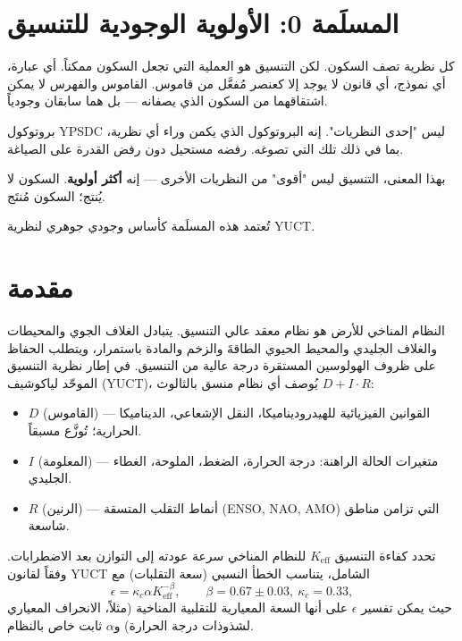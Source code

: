 \documentclass[11pt,a4paper]{article}
\newcommand{\Keff}{K_{\mathrm{eff}}}
\newcommand{\kappac}{\kappa_c}
\newcommand{\be}{\beta}
\begin{document}
	\tableofcontents
	
	\section*{المسلَمة 0: الأولوية الوجودية للتنسيق}
	
	كل نظرية تصف السكون. لكن التنسيق هو العملية التي تجعل السكون ممكناً.
	أي عبارة، أي نموذج، أي قانون لا يوجد إلا كعنصر مُفعَّل من قاموس.
	القاموس والفهرس لا يمكن اشتقاقهما من السكون الذي يصفانه — بل هما سابقان وجودياً.
	
	بروتوكول YPSDC ليس "إحدى النظريات".
	إنه البروتوكول الذي يكمن وراء أي نظرية، بما في ذلك تلك التي تصوغه.
	رفضه مستحيل دون رفض القدرة على الصياغة.
	
	بهذا المعنى، التنسيق ليس "أقوى" من النظريات الأخرى — إنه \textbf{أكثر أولوية}.
	السكون لا يُنتج؛ السكون مُنتَج.
	
	تُعتمد هذه المسلَمة كأساس وجودي جوهري لنظرية YUCT.
	
	\section{مقدمة}
	
	النظام المناخي للأرض هو نظام معقد عالي التنسيق. يتبادل الغلاف الجوي والمحيطات والغلاف الجليدي والمحيط الحيوي الطاقةَ والزخم والمادة باستمرار، ويتطلب الحفاظ على ظروف الهولوسين المستقرة درجة عالية من التنسيق. في إطار نظرية التنسيق الموحّد لياكوشيف (YUCT)، يُوصف أي نظام منسق بالثالوث \(D + I \cdot R\):
	
	\begin{itemize}
		\item \(D\) (القاموس) — القوانين الفيزيائية للهيدروديناميكا، النقل الإشعاعي، الديناميكا الحرارية؛ تُوزَّع مسبقاً.
		\item \(I\) (المعلومة) — متغيرات الحالة الراهنة: درجة الحرارة، الضغط، الملوحة، الغطاء الجليدي.
		\item \(R\) (الرنين) — أنماط التقلب المتسقة (ENSO, NAO, AMO) التي تزامن مناطق شاسعة.
	\end{itemize}
	
	تحدد كفاءة التنسيق \(\Keff\) للنظام المناخي سرعة عودته إلى التوازن بعد الاضطرابات. وفقاً لقانون YUCT الشامل، يتناسب الخطأ النسبي (سعة التقلبات) مع
	\[
	\epsilon = \kappac \alpha \Keff^{-\be}, \qquad \be = 0.67 \pm 0.03,\ \kappac = 0.33,
	\]
	حيث يمكن تفسير \(\epsilon\) على أنها السعة المعيارية للتقلبية المناخية (مثلاً، الانحراف المعياري لشذوذات درجة الحرارة) و\(\alpha\) ثابت خاص بالنظام.
	
\end{document}
